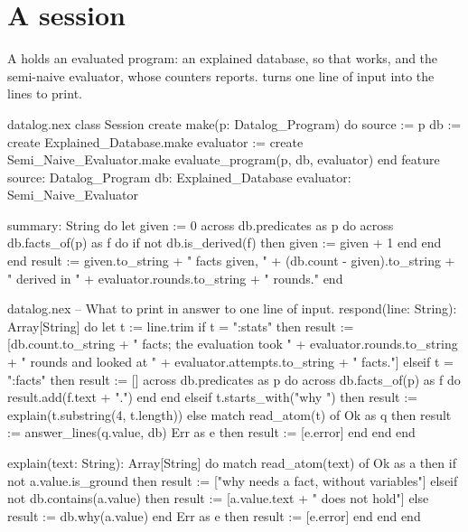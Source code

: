 \section{A session}

A  holds an evaluated program: an explained database, so that
 works, and the semi-naive evaluator, whose counters
 reports.  turns one line of input into the lines
to print.

\begin{continued}{datalog.nex}
class Session
create
  make(p: Datalog_Program)
  do
    source := p
    db := create Explained_Database.make
    evaluator := create Semi_Naive_Evaluator.make
    evaluate_program(p, db, evaluator)
  end
feature
  source: Datalog_Program
  db: Explained_Database
  evaluator: Semi_Naive_Evaluator

  summary: String
  do
    let given := 0
    across db.predicates as p do
      across db.facts_of(p) as f do
        if not db.is_derived(f) then
          given := given + 1
        end
      end
    end
    result := given.to_string + " facts given, " + (db.count - given).to_string
              + " derived in " + evaluator.rounds.to_string + " rounds."
  end
\end{continued}

\begin{continued}{datalog.nex}
  -- What to print in answer to one line of input.
  respond(line: String): Array[String]
  do
    let t := line.trim
    if t = ":stats" then
      result := [db.count.to_string + " facts; the evaluation took "
                 + evaluator.rounds.to_string + " rounds and looked at "
                 + evaluator.attempts.to_string + " facts."]
    elseif t = ":facts" then
      result := []
      across db.predicates as p do
        across db.facts_of(p) as f do
          result.add(f.text + ".")
        end
      end
    elseif t.starts_with("why ") then
      result := explain(t.substring(4, t.length))
    else
      match read_atom(t) of
        Ok as q then result := answer_lines(q.value, db)
        Err as e then result := [e.error]
      end
    end
  end

  explain(text: String): Array[String]
  do
    match read_atom(text) of
      Ok as a then
        if not a.value.is_ground then
          result := ["why needs a fact, without variables"]
        elseif not db.contains(a.value) then
          result := [a.value.text + " does not hold"]
        else
          result := db.why(a.value)
        end
      Err as e then result := [e.error]
    end
  end
end
\end{continued}


